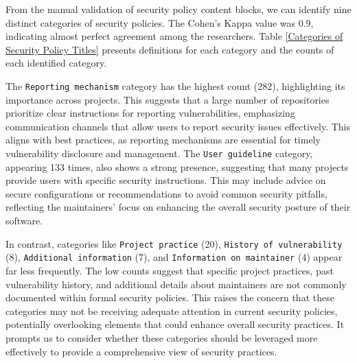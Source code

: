 From the manual validation of security policy content blocks, we can identify nine distinct categories of security policies. The Cohen’s Kappa value was 0.9, indicating almost perfect agreement among the researchers. Table \ref{Categories of Security Policy Titles} presents definitions for each category and the counts of each identified category.

The \texttt{Reporting mechanism} category has the highest count (282), highlighting its importance across projects. This suggests that a large number of repositories prioritize clear instructions for reporting vulnerabilities, emphasizing communication channels that allow users to report security issues effectively. This aligns with best practices, as reporting mechanisms are essential for timely vulnerability disclosure and management. The \texttt{User guideline} category, appearing 133 times, also shows a strong presence, suggesting that many projects provide users with specific security instructions. This may include advice on secure configurations or recommendations to avoid common security pitfalls, reflecting the maintainers’ focus on enhancing the overall security posture of their software.

In contrast, categories like \texttt{Project practice} (20), \texttt{History of vulnerability} (8), \texttt{Additional information} (7), and \texttt{Information on maintainer} (4) appear far less frequently. The low counts suggest that specific project practices, past vulnerability history, and additional details about maintainers are not commonly documented within formal security policies. This raises the concern that these categories may not be receiving adequate attention in current security policies, potentially overlooking elements that could enhance overall security practices. It prompts us to consider whether these categories should be leveraged more effectively to provide a comprehensive view of security practices.


